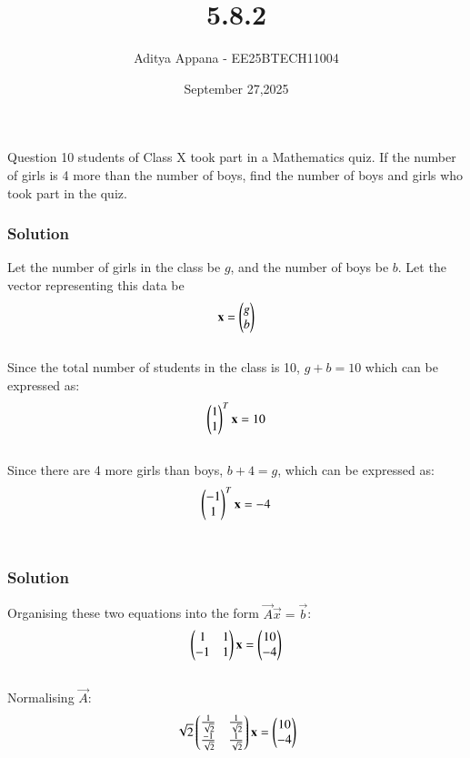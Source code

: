 \documentclass{beamer}
\title %
{5.8.2}
\date{September 27,2025}
\author %
{Aditya Appana - EE25BTECH11004}
\begin{document}
\frame{\titlepage}
\begin{frame}{Question}
10 students of Class X took part in a Mathematics quiz. If the number of girls is 4
more than the number of boys, find the number of boys and girls who took part in
the quiz.
\end{frame}



\begin{frame}[fragile]
    \frametitle{Solution}
Let the number of girls in the class be $g$, and the number of boys be $b$. Let the vector representing this data be 
\begin{align}
\mathbf{x} = \begin{pmatrix}g\\b\end{pmatrix}    
\end{align}\\
Since the total number of students in the class is 10, $g+b=10$ which can be expressed as:
\begin{align}
\begin{pmatrix}1\\1\end{pmatrix}^T\mathbf{x} = 10
\end{align}\\
Since there are 4 more girls than boys, $b+4=g$, which can be expressed as:
\begin{align}
\begin{pmatrix}-1 \\ 1\end{pmatrix}^T\mathbf{x} = -4
\end{align}\\

\end{frame}


\begin{frame}[fragile]
    \frametitle{Solution}
    
Organising these two equations into the form $\vec{A}\vec{x} = \vec{b}$:
\begin{align}
\begin{pmatrix}1&1 \\ -1&1\end{pmatrix} \mathbf{x} = \begin{pmatrix}10\\-4\end{pmatrix}
\end{align}\\
Normalising $\vec{A}$: 
\begin{align}
\sqrt{2} \begin{pmatrix}\frac{1}{\sqrt{2}} & \frac{1}{\sqrt{2}} \\  \frac{-1}{\sqrt{2}}& \frac{1}{\sqrt{2}}\end{pmatrix} \mathbf{x} = \begin{pmatrix}10\\-4\end{pmatrix}
\end{align}
\end{frame}
\end{document}
